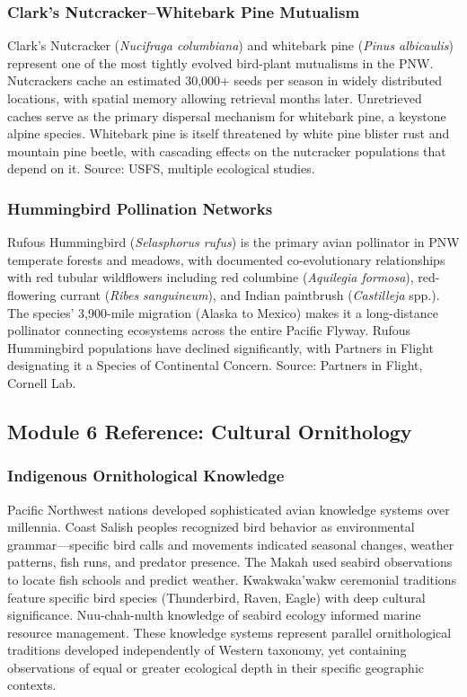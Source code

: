 \documentclass[11pt,letterpaper]{article}
\begin{document}
\subsubsection{Clark's Nutcracker--Whitebark Pine Mutualism}
Clark's Nutcracker (\textit{Nucifraga columbiana}) and whitebark pine (\textit{Pinus albicaulis}) represent one of the most tightly evolved bird-plant mutualisms in the PNW. Nutcrackers cache an estimated 30,000+ seeds per season in widely distributed locations, with spatial memory allowing retrieval months later. Unretrieved caches serve as the primary dispersal mechanism for whitebark pine, a keystone alpine species. Whitebark pine is itself threatened by white pine blister rust and mountain pine beetle, with cascading effects on the nutcracker populations that depend on it. Source: USFS, multiple ecological studies.

\subsubsection{Hummingbird Pollination Networks}
Rufous Hummingbird (\textit{Selasphorus rufus}) is the primary avian pollinator in PNW temperate forests and meadows, with documented co-evolutionary relationships with red tubular wildflowers including red columbine (\textit{Aquilegia formosa}), red-flowering currant (\textit{Ribes sanguineum}), and Indian paintbrush (\textit{Castilleja} spp.). The species' 3,900-mile migration (Alaska to Mexico) makes it a long-distance pollinator connecting ecosystems across the entire Pacific Flyway. Rufous Hummingbird populations have declined significantly, with Partners in Flight designating it a Species of Continental Concern. Source: Partners in Flight, Cornell Lab.

\subsection{Module 6 Reference: Cultural Ornithology}

\subsubsection{Indigenous Ornithological Knowledge}
Pacific Northwest nations developed sophisticated avian knowledge systems over millennia. Coast Salish peoples recognized bird behavior as environmental grammar---specific bird calls and movements indicated seasonal changes, weather patterns, fish runs, and predator presence. The Makah used seabird observations to locate fish schools and predict weather. Kwakwaka'wakw ceremonial traditions feature specific bird species (Thunderbird, Raven, Eagle) with deep cultural significance. Nuu-chah-nulth knowledge of seabird ecology informed marine resource management. These knowledge systems represent parallel ornithological traditions developed independently of Western taxonomy, yet containing observations of equal or greater ecological depth in their specific geographic contexts.
\end{document}
